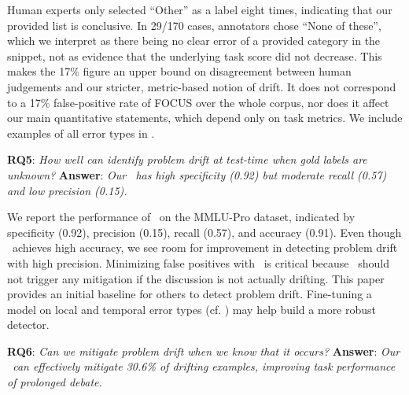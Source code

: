 Human experts only selected ``Other'' as a label eight times, indicating that our provided list is conclusive.
In 29/170 cases, annotators chose ``None of these'', which we interpret as there being no clear error of a provided category in the snippet, not as evidence that the underlying task score did not decrease.
This makes the 17\% figure an upper bound on disagreement between human judgements and our stricter, metric-based notion of drift.
It does not correspond to a 17\% false-positive rate of FOCUS over the whole corpus, nor does it affect our main quantitative statements, which depend only on task metrics.
We include examples of all error types in .

\noindent \textbf{RQ5}: \textit{How well can identify problem drift at test-time when gold labels are unknown?} \textbf{Answer}: \textit{Our \judge\ has high specificity (0.92) but moderate recall (0.57) and low precision (0.15).}

%

We report the performance of \judge\ on the MMLU-Pro dataset, indicated by specificity (0.92), precision (0.15), recall (0.57), and accuracy (0.91).
Even though \judge\ achieves high accuracy, we see room for improvement in detecting problem drift with high precision.
Minimizing false positives with \judge\ is critical because \judge\ should not trigger any mitigation if the discussion is not actually drifting.
This paper provides an initial baseline for others to detect problem drift.
Fine-tuning a model on local and temporal error types (cf. ) may help build a more robust detector.

\noindent \textbf{RQ6}: \textit{Can we mitigate problem drift when we know that it occurs?} \textbf{Answer}: \textit{Our \policy\ can effectively mitigate 30.6\% of drifting examples, improving task performance of prolonged debate.}



